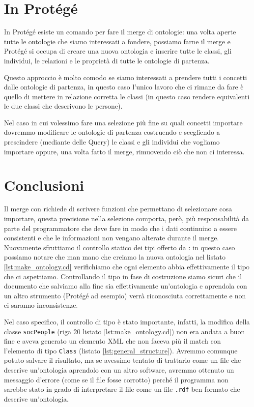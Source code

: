\section{In Protégé}
In Protégé esiste un comando per fare il merge di ontologie: una volta aperte tutte le ontologie che siamo interessati a fondere, possiamo farne il merge e Protégé si occupa di creare una nuova ontologia e inserire tutte le classi, gli individui, le relazioni e le proprietà di tutte le ontologie di partenza. 

Questo approccio è molto comodo se siamo interessati a prendere tutti i concetti dalle ontologie di partenza, in questo caso l'unico lavoro che ci rimane da fare è quello di mettere in relazione corretta le classi (in questo caso rendere equivalenti le due classi che descrivono le persone). 

Nel caso in cui volessimo fare una selezione più fine su quali concetti importare dovremmo modificare le ontologie di partenza costruendo e scegliendo a prescindere (mediante delle Query) le classi e gli individui che vogliamo importare oppure, una volta fatto il merge, rimuovendo ciò che non ci interessa.
\section{Conclusioni}
Il merge con \cduce richiede di scrivere funzioni che permettano di selezionare cosa importare, questa precisione nella selezione comporta, però, più responsabilità da parte del programmatore che deve fare in modo che i dati continuino a essere consistenti e che le informazioni non vengano alterate durante il merge. Nuovamente sfruttiamo il controllo statico dei tipi offerto da \cduce: in questo caso possiamo notare che man mano che creiamo la nuova ontologia nel listato \ref{lst:make_ontology.cd} verifichiamo che ogni elemento abbia effettivamente il tipo che ci aspettiamo. Controllando il tipo in fase di costruzione siamo sicuri che il documento che salviamo alla fine sia effettivamente un'ontologia e aprendola con un altro strumento (Protégé ad esempio) verrà riconosciuta correttamente e non ci saranno inconsistenze.

Nel caso specifico, il controllo di tipo è stato importante, infatti, la modifica della classe \verb|socPeople| (riga 20 listato \ref{lst:make_ontology.cd}) non era andata a buon fine e aveva generato un elemento XML che non faceva più il match con l'elemento di tipo \verb|Class| (listato \ref{lst:general_structure}). Avremmo comunque potuto salvare il risultato, ma se avessimo tentato di trattarlo come un file che descrive un'ontologia aprendolo con un altro software, avremmo ottenuto un messaggio d'errore (come se il file fosse corrotto) perché il programma non sarebbe stato in grado di interpretare il file come un file \verb|.rdf| ben formato che descrive un'ontologia.


